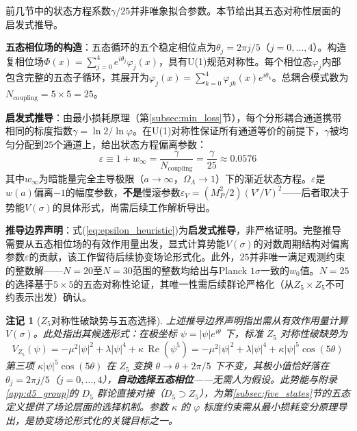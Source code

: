 \documentclass[12pt,a4paper,twocolumn]{article}
\renewcommand{\phi}{\varphi}
\newtheorem{remark}[theorem]{注记}
\begin{document}
前几节中的状态方程系数$\gamma/25$并非唯象拟合参数。本节给出其五态对称性层面的启发式推导。

\textbf{五态相位场的构造}：五态循环的五个稳定相位点为$\theta_j = 2\pi j/5$（$j=0,\ldots,4$）。构造复相位场$\Phi(x) = \sum_{j=0}^{4} e^{i\theta_j} \phi_j(x)$，具有U(1)规范对称性。每个相位态$\phi_j$内部包含完整的五态子循环，其展开为$\phi_j(x) = \sum_{k=0}^{4} \phi_{jk}(x) e^{i\theta_k}$。总耦合模式数为$N_{\text{coupling}} = 5 \times 5 = 25$。

\textbf{启发式推导}：由最小损耗原理（第\ref{subsec:min_loss}节），每个分形耦合通道携带相同的标度指数$\gamma = \ln2/\ln\phi$。在U(1)对称性保证所有通道等价的前提下，$\gamma$被均匀分配到$25$个通道上，给出状态方程偏离参数：
\begin{equation}
\varepsilon \equiv 1 + w_\infty = \frac{\gamma}{N_{\text{coupling}}} = \frac{\gamma}{25} \approx 0.0576
\label{eq:epsilon_heuristic}
\end{equation}
其中$w_\infty$为暗能量完全主导极限（$a\to\infty$，$\Omega_\Lambda\to 1$）下的渐近状态方程。$\varepsilon$是$w(a)$偏离$-1$的幅度参数，\textbf{不是}慢滚参数$\varepsilon_V = (M_P^2/2)(V'/V)^2$——后者取决于势能$V(\sigma)$的具体形式，尚需后续工作解析导出。

\textbf{推导边界声明}：式(\ref{eq:epsilon_heuristic})为\textbf{启发式推导}，非严格证明。完整推导需要从五态相位场的有效作用量出发，显式计算势能$V(\sigma)$的对数周期结构对偏离参数$\varepsilon$的贡献，该工作留待后续协变场论形式化。此外，$25$并非唯一满足观测约束的整数解——$N=20$至$N=30$范围的整数均给出与Planck $1\sigma$一致的$w_0$值。$N=25$的选择基于$5\times5$的五态对称性论证，其唯一性需后续群论严格化（从$Z_5 \times Z_5$不可约表示出发）确认。

\begin{remark}[$Z_5$对称性破缺势与五态选择]
\label{rmk:z5_potential}
上述推导边界声明指出需从有效作用量计算 $V(\sigma)$。此处指出其候选形式：在极坐标 $\psi = |\psi|e^{i\theta}$ 下，标准 $Z_5$ 对称性破缺势为
\begin{equation}
V_{Z_5}(\psi) = -\mu^2|\psi|^2 + \lambda|\psi|^4 + \kappa\,\operatorname{Re}(\psi^5) = -\mu^2|\psi|^2 + \lambda|\psi|^4 + \kappa|\psi|^5\cos(5\theta)
\end{equation}
第三项 $\kappa|\psi|^5\cos(5\theta)$ 在 $Z_5$ 变换 $\theta \to \theta + 2\pi/5$ 下不变，其极小值恰好落在 $\theta_j = 2\pi j/5$（$j=0,\ldots,4$），\textbf{自动选择五态相位}——无需人为假设。此势能与附录\ref{app:d5_group}的 $D_5$ 群论直接对接（$D_5 \supset Z_5$），为第\ref{subsec:five_states}节的五态定义提供了场论层面的选择机制。参数 $\kappa$ 的 $\phi$ 标度约束需从最小损耗变分原理导出，是协变场论形式化的关键目标之一。
\end{remark}
\end{document}
